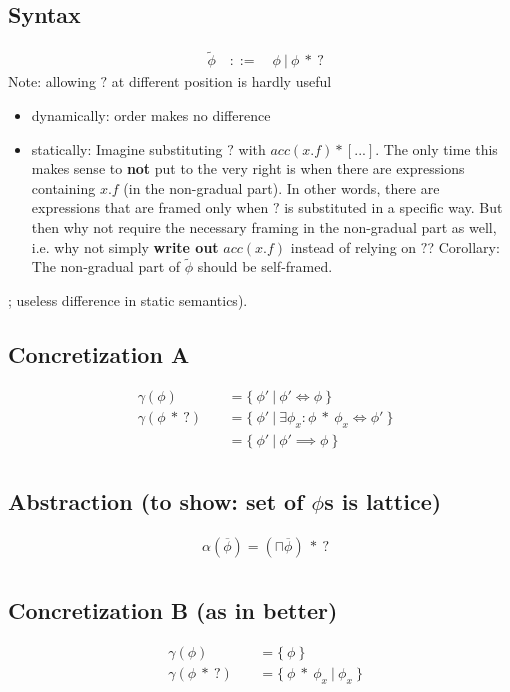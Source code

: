 \documentclass[11pt,a4paper]{article}
\begin{document}
\subsection{Syntax}
\begin{align*}
&\widetilde{\phi} \quad ::= \quad \phi ~|~ \phi\:*\:?
\end{align*}
Note: allowing $?$ at different position is hardly useful
\begin{itemize}
\item dynamically: order makes no difference
\item statically: Imagine substituting $?$ with $acc(x.f) * [...]$. The only time this makes sense to \textbf{not} put to the very right is when there are expressions containing $x.f$ (in the non-gradual part). In other words, there are expressions that are framed only when $?$ is substituted in a specific way. But then why not require the necessary framing in the non-gradual part as well, i.e. why not simply \textbf{write out} $acc(x.f)$ instead of relying on $?$? Corollary: The non-gradual part of $\widetilde{\phi}$ should be self-framed.
\end{itemize}
; useless difference in static semantics).

\subsection{Concretization A}
\begin{align*}
&\gamma(\phi) ~&&= \{~ \phi' ~|~ \phi' \iff \phi ~\} \\
&\gamma(\phi\:*\:?) ~&&= \{~ \phi' ~|~ \exists \phi_x : \phi\:*\:\phi_x \iff \phi' ~\} \\
&  ~&&= \{~ \phi' ~|~ \phi' \implies \phi ~\} \\
\end{align*}

\subsection{Abstraction (to show: set of $\phi$s is lattice)}
\begin{align*}
&\alpha(\overline{\phi}) = (\sqcap \overline{\phi})\:*\:? \\
\end{align*}

\subsection{Concretization B (as in better)}
\begin{align*}
&\gamma(\phi) ~&&= \{~ \phi ~\} \\
&\gamma(\phi\:*\:?) ~&&= \{~ \phi\:*\:\phi_x ~|~ \phi_x ~\} \\
\end{align*}
\end{document}

